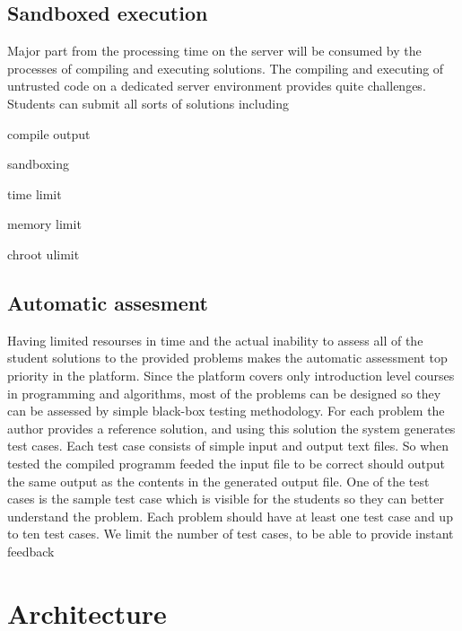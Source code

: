\documentclass{article}
\begin{document}
\subsection{Sandboxed execution}
Major part from the processing time on the server will be consumed by the
processes of compiling and executing solutions. The compiling and executing of
untrusted code on a dedicated server environment provides quite challenges.
Students can submit all sorts of solutions including 

compile output

sandboxing

time limit

memory limit

chroot
ulimit

\subsection{Automatic assesment}
Having limited resourses in time and the actual inability to assess all of the
student solutions to the provided problems makes the automatic assessment
top priority in the platform. Since the platform covers only introduction level
courses in programming and algorithms, most of the problems can be designed so
they can be assessed by simple black-box testing methodology. For each problem
the author provides a reference solution, and using this solution the system
generates test cases. Each test case consists of simple input and output text
files. So when tested the compiled programm feeded the input file to be correct
should output the same output as the contents in the generated output file. One
of the test cases is the sample test case which is visible for the students so
they can better understand the problem. Each problem should have at least one
test case and up to ten test cases. We limit the number of test cases, to be
able to provide instant feedback


\section{Architecture}
\end{document}
